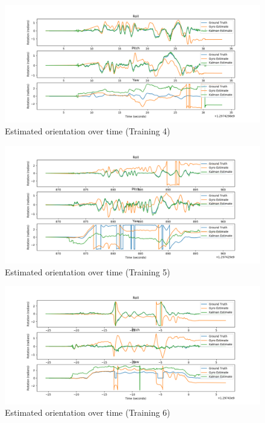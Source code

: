 \documentclass[a4paper]{article}
\begin{document}
\begin{figure}[h]
  \centering
    \includegraphics[width=1\textwidth]{rpy_trainset4.png}
  \caption{Estimated orientation over time (Training 4)\label{fig:rpy_trainset4}}
\end{figure}

\begin{figure}[h]
  \centering
    \includegraphics[width=1\textwidth]{rpy_trainset5.png}
  \caption{Estimated orientation over time (Training 5)\label{fig:rpy_trainset5}}
\end{figure}

\begin{figure}[h]
  \centering
    \includegraphics[width=1\textwidth]{rpy_trainset6.png}
  \caption{Estimated orientation over time (Training 6)\label{fig:rpy_trainset6}}
\end{figure}
\end{document}
